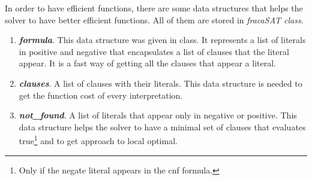 
In order to have efficient functions, there are some data structures that helps the solver to have better efficient functions. All of them are stored in \textit{fracaSAT class}.
\begin{enumerate}
\item \textbf{\textit{formula}}. This data structure was given in class. It represents a list of literals in positive and negative that encapsulates a list of clauses that the literal appear. It is a fast way of getting all the clauses that appear a literal.
\item \textbf{\textit{clauses}}. A list of clauses with their literals. This data structure is needed to get the function cost of every interpretation.
\item \textbf{\textit{not\_found}}. A list of literals that appear only in negative or positive. This data structure helps the solver to have a minimal set of clauses that evaluates true\footnote{Only if the negate literal appears in the cnf formula.} and to get approach to local optimal.
\end{enumerate}
